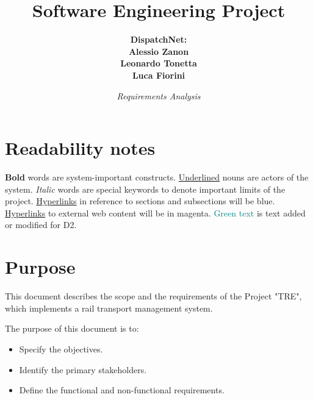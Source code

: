 \documentclass[12pt]{article}
\title{\bf{Software Engineering Project}}
\author{\bf{DispatchNet:} \\ Alessio Zanon \\ Leonardo Tonetta \\ Luca Fiorini}
\date{\it{Requirements Analysis}}
\renewcommand\bf[1]{\textbf{#1}}
\renewcommand\it[1]{\textit{#1}}
\newcommand\un[1]{\underline{#1}}
\begin{document}
\maketitle

\newpage
\tableofcontents \label{Contents}

\section*{Readability notes}
\bf{Bold} words are system-important constructs. \newline
\un{Underlined} nouns are actors of the system. \newline
\it{Italic} words are special keywords to denote important limits of the project. \newline
\hyperref[Contents]{Hyperlinks} in reference to sections and subsections will be blue. \newline
\href{https:\\www.google.com}{Hyperlinks} to external web content will be in magenta. \newline
\textcolor{teal}{Green text} is text added or modified for D2.

\newpage

\section*{Purpose}
This document describes the scope and the requirements of the Project "TRE", which implements a rail transport management system.

The purpose of this document is to: 
\begin{itemize}
	\item Specify the objectives.
	\item Identify the primary stakeholders.
	\item Define the functional and non-functional requirements.
\end{itemize}


\end{document}
